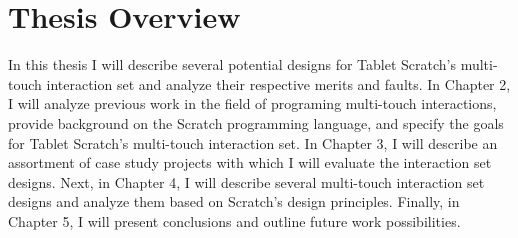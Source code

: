 \section{Thesis Overview}
In this thesis I will describe several potential designs for Tablet Scratch's multi-touch interaction set and analyze their respective merits and faults. In Chapter 2, I will analyze previous work in the field of programing multi-touch interactions, provide background on the Scratch programming language, and specify the goals for Tablet Scratch's multi-touch interaction set. In Chapter 3, I will describe an assortment of case study projects with which I will evaluate the interaction set designs. Next, in Chapter 4, I will describe several multi-touch interaction set designs and analyze them based on Scratch's design principles. Finally, in Chapter 5, I will present conclusions and outline future work possibilities.


